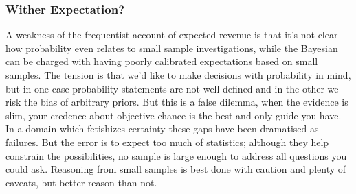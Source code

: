\documentclass[10pt,a4paper,notitlepage, twocolumn]{article}
\begin{document}
\subsubsection*{Wither Expectation?}
A weakness of the frequentist account of expected revenue is that it's not clear how probability even relates to small sample investigations, while the Bayesian can be charged with having poorly calibrated expectations based on small samples. The tension is that we'd like to make decisions with probability in mind, but in one case probability statements are not well defined and in the other we risk the bias of arbitrary priors. But this is a false dilemma, when the evidence is slim, your credence about objective chance is the best and only guide you have. In a domain which fetishizes certainty these gaps have been dramatised as failures. But the error is to expect too much of statistics; although they help constrain the possibilities, no sample is large enough to address all questions you could ask. Reasoning from small samples is best done with caution and plenty of caveats, but better reason than not. 
\end{document}
